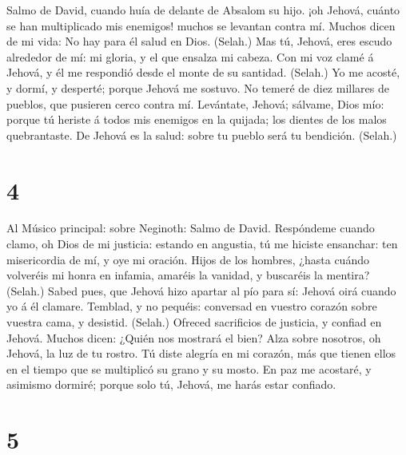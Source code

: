  Salmo de David, cuando huía de delante de Absalom su
hijo. ¡oh Jehová, cuánto se han multiplicado mis enemigos! muchos se
levantan contra mí.  Muchos dicen de mi vida: No hay para
él salud en Dios. (Selah.)  Mas tú, Jehová, eres escudo
alrededor de mí: mi gloria, y el que ensalza mi cabeza. 
Con mi voz clamé á Jehová, y él me respondió desde el monte de su
santidad. (Selah.)  Yo me acosté, y dormí, y desperté;
porque Jehová me sostuvo.  No temeré de diez millares de
pueblos, que pusieren cerco contra mí.  Levántate, Jehová;
sálvame, Dios mío: porque tú heriste á todos mis enemigos en la quijada;
los dientes de los malos quebrantaste.  De Jehová es la
salud: sobre tu pueblo será tu bendición. (Selah.)

\hypertarget{section-3}{%
\section{4}\label{section-3}}

 Al Músico principal: sobre Neginoth: Salmo de David.
Respóndeme cuando clamo, oh Dios de mi justicia: estando en angustia, tú
me hiciste ensanchar: ten misericordia de mí, y oye mi oración.
 Hijos de los hombres, ¿hasta cuándo volveréis mi honra en
infamia, amaréis la vanidad, y buscaréis la mentira? (Selah.)
 Sabed pues, que Jehová hizo apartar al pío para sí:
Jehová oirá cuando yo á él clamare.  Temblad, y no
pequéis: conversad en vuestro corazón sobre vuestra cama, y desistid.
(Selah.)  Ofreced sacrificios de justicia, y confiad en
Jehová.  Muchos dicen: ¿Quién nos mostrará el bien? Alza
sobre nosotros, oh Jehová, la luz de tu rostro.  Tú diste
alegría en mi corazón, más que tienen ellos en el tiempo que se
multiplicó su grano y su mosto.  En paz me acostaré, y
asimismo dormiré; porque solo tú, Jehová, me harás estar confiado.

\hypertarget{section-4}{%
\section{5}\label{section-4}}

